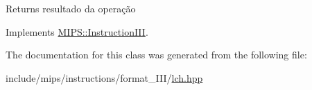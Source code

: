 \begin{DoxyReturn}{Returns}
resultado da operação 
\end{DoxyReturn}


Implements \hyperlink{classMIPS_1_1InstructionIII_aee3071c23abc542e55b446abee766c5e}{M\+I\+P\+S\+::\+Instruction\+I\+II}.



The documentation for this class was generated from the following file\+:\begin{DoxyCompactItemize}
\item 
include/mips/instructions/format\+\_\+\+I\+I\+I/\hyperlink{lch_8hpp}{lch.\+hpp}\end{DoxyCompactItemize}
